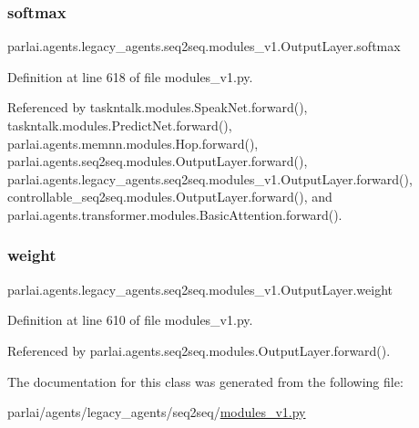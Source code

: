 \subsubsection{\texorpdfstring{softmax}{softmax}}
{\footnotesize\ttfamily parlai.\+agents.\+legacy\+\_\+agents.\+seq2seq.\+modules\+\_\+v1.\+Output\+Layer.\+softmax}



Definition at line 618 of file modules\+\_\+v1.\+py.



Referenced by taskntalk.\+modules.\+Speak\+Net.\+forward(), taskntalk.\+modules.\+Predict\+Net.\+forward(), parlai.\+agents.\+memnn.\+modules.\+Hop.\+forward(), parlai.\+agents.\+seq2seq.\+modules.\+Output\+Layer.\+forward(), parlai.\+agents.\+legacy\+\_\+agents.\+seq2seq.\+modules\+\_\+v1.\+Output\+Layer.\+forward(), controllable\+\_\+seq2seq.\+modules.\+Output\+Layer.\+forward(), and parlai.\+agents.\+transformer.\+modules.\+Basic\+Attention.\+forward().

\mbox{\label{classparlai_1_1agents_1_1legacy__agents_1_1seq2seq_1_1modules__v1_1_1OutputLayer_aa16722ddd0a958a40f91d8f9c6b77b11}} 
\subsubsection{\texorpdfstring{weight}{weight}}
{\footnotesize\ttfamily parlai.\+agents.\+legacy\+\_\+agents.\+seq2seq.\+modules\+\_\+v1.\+Output\+Layer.\+weight}



Definition at line 610 of file modules\+\_\+v1.\+py.



Referenced by parlai.\+agents.\+seq2seq.\+modules.\+Output\+Layer.\+forward().



The documentation for this class was generated from the following file\+:\begin{DoxyCompactItemize}
\item 
parlai/agents/legacy\+\_\+agents/seq2seq/\hyperlink{modules__v1_8py}{modules\+\_\+v1.\+py}\end{DoxyCompactItemize}
